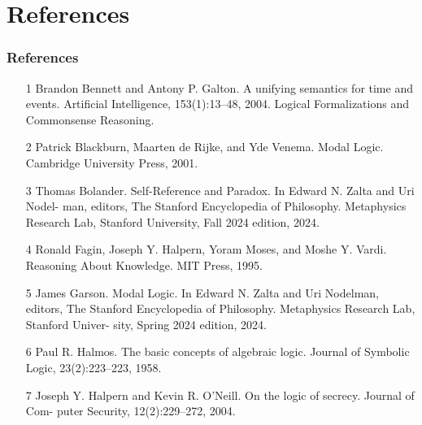 \documentclass[aspectratio=169]{beamer}
\begin{document}
\section{References}
\begin{frame}
\frametitle{References}
\footnotesize
\begin{itemize}
    \item [1] Brandon Bennett and Antony P. Galton. A unifying semantics for time and events.
    Artificial Intelligence, 153(1):13–48, 2004. Logical Formalizations and Commonsense
    Reasoning.
    \item [2] Patrick Blackburn, Maarten de Rijke, and Yde Venema. Modal Logic. Cambridge
    University Press, 2001.
    \item [3] Thomas Bolander. Self-Reference and Paradox. In Edward N. Zalta and Uri Nodel-
    man, editors, The Stanford Encyclopedia of Philosophy. Metaphysics Research Lab,
    Stanford University, Fall 2024 edition, 2024.
    \item [4] Ronald Fagin, Joseph Y. Halpern, Yoram Moses, and Moshe Y. Vardi. Reasoning
    About Knowledge. MIT Press, 1995.
    \item [5] James Garson. Modal Logic. In Edward N. Zalta and Uri Nodelman, editors, The
    Stanford Encyclopedia of Philosophy. Metaphysics Research Lab, Stanford Univer-
    sity, Spring 2024 edition, 2024.
    \item [6] Paul R. Halmos. The basic concepts of algebraic logic. Journal of Symbolic Logic,
    23(2):223–223, 1958.
    \item [7] Joseph Y. Halpern and Kevin R. O’Neill. On the logic of secrecy. Journal of Com-
    puter Security, 12(2):229–272, 2004.
\end{itemize}
\end{frame}
\end{document}
